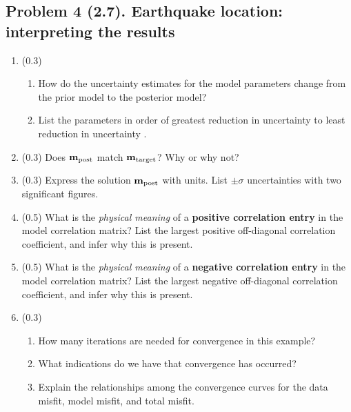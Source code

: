 \documentclass[11pt,titlepage,fleqn]{article}
\begin{document}

\pagebreak
\subsection*{Problem 4 (2.7). Earthquake location: interpreting the results}

\begin{enumerate}

\item (0.3)
\begin{enumerate}
\item How do the uncertainty estimates for the model parameters change from the prior model to the posterior model?
\item List the parameters in order of greatest reduction in uncertainty to least reduction in uncertainty .
\end{enumerate}


\item (0.3) Does $\mbox{${\bf m}$}_{\rm post}$ match $\mbox{${\bf m}$}_{\rm target}$? Why or why not?


\item (0.3) Express the solution $\mbox{${\bf m}$}_{\rm post}$ with units. List $\pm\sigma$ uncertainties with two significant figures.


\item (0.5) What is the {\em physical meaning} of a {\bf positive correlation entry} in the model correlation matrix? List the largest positive off-diagonal correlation coefficient, and infer why this is present.


\item (0.5) What is the {\em physical meaning} of a {\bf negative correlation entry} in the model correlation matrix? List the largest negative off-diagonal correlation coefficient, and infer why this is present.


\item (0.3)
%
\begin{enumerate}
\item How many iterations are needed for convergence in this example?
\item What indications do we have that convergence has occurred?
\item Explain the relationships among the convergence curves for the data misfit, model misfit, and total misfit.
\end{enumerate}


\end{enumerate}
\end{document}
